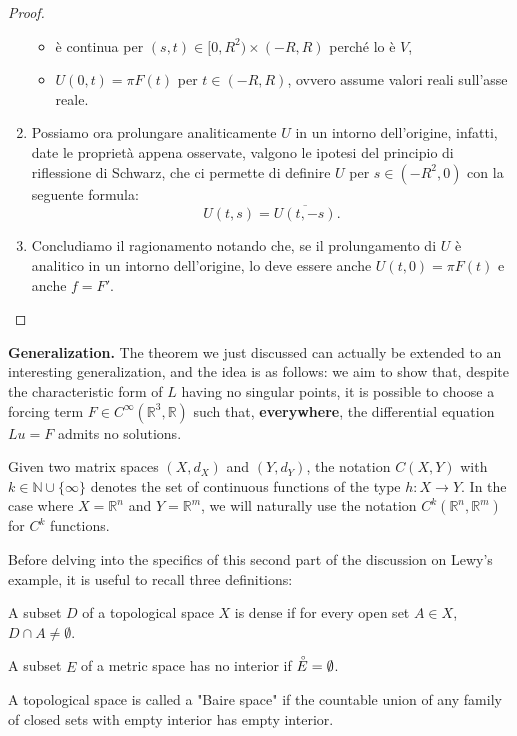 \begin{proof}
\begin{enumerate}[1.]
\begin{itemize}
\item
è continua per $(s,t) \in [0,R^2) \times (-R,R)$ perché lo è $V$,
\item
$U(0,t)=\pi F(t)$ per $t\in (-R,R)$, ovvero assume valori reali sull'asse reale.
\end{itemize}
\item
Possiamo ora prolungare analiticamente $U$ in un intorno dell'origine, infatti, 
date le proprietà appena osservate, valgono le ipotesi del principio di riflessione di Schwarz, che ci permette 
di definire $U$ per $s\in (-R^2,0)$ con la seguente formula: $$U(t,s)=\overline{U(t,-s)}.$$
\item
Concludiamo il ragionamento notando che, se il prolungamento di $U$ è analitico in un intorno dell'origine, lo deve essere anche $U(t,0)=\pi F(t)$ e anche $f=F'$. \qedhere
\end{enumerate}
\end{proof}

\textbf{Generalization.} The theorem we just discussed can actually be extended to an interesting generalization, and the idea is as follows: we aim to show that, despite the characteristic form of $L$ having no singular points, it is possible to choose a forcing term $F \in C^{\infty} (\mathbb{R}^3, \mathbb{R})$ such that, \textbf{everywhere}, the differential equation $Lu=F$ admits no solutions.

\begin{remark}
Given two matrix spaces $(X,d_X)$ and $(Y,d_Y)$, the notation $C(X,Y)$ with $k \in \mathbb{N} \cup \{\infty\}$ denotes the set of continuous functions of the type $h:X \rightarrow Y$. In the case where $X=\mathbb{R}^n$ and $Y=\mathbb{R}^m$, we will naturally use the notation $C^k(\mathbb{R}^n,\mathbb{R}^m)$ for $C^k$ functions.
\end{remark}

Before delving into the specifics of this second part of the discussion on Lewy's example, it is useful to recall three definitions:
\begin{definition}
A subset $D$ of a topological space $X$ is dense if for every open set $A \in X$, $D \cap A \neq \emptyset$.
\end{definition}
\begin{definition}
A subset $E$ of a metric space has no interior if $\accentset{\circ}{E}=\emptyset$.
\end{definition}
\begin{definition}
A topological space is called a "Baire space" if the countable union of any family of closed sets with empty interior has empty interior.
\end{definition}

